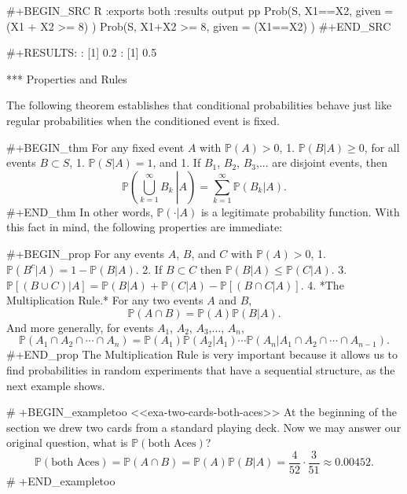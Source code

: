 #+BEGIN_SRC R :exports both :results output pp  
Prob(S, X1==X2, given = (X1 + X2 >= 8) )
Prob(S, X1+X2 >= 8, given = (X1==X2) )
#+END_SRC

#+RESULTS:
: [1] 0.2
: [1] 0.5

*** Properties and Rules

The following theorem establishes that conditional probabilities
behave just like regular probabilities when the conditioned event is
fixed.

#+BEGIN_thm
For any fixed event \(A\) with \(\mathbb{P}(A)>0\),
1. \( \mathbb{P} (B|A)\geq 0 \), for all events \( B \subset S\),
1. \( \mathbb{P} (S|A) = 1 \), and
1. If \(B_{1}\), \(B_{2}\), \(B_{3}\),... are disjoint events, then
  \begin{equation}
  \mathbb{P}\left(\left.\bigcup_{k=1}^{\infty}B_{k}\:\right|A\right)=\sum_{k=1}^{\infty}\mathbb{P}(B_{k}|A).
  \end{equation}
#+END_thm
In other words, \(\mathbb{P}(\cdot|A)\) is a legitimate probability
function. With this fact in mind, the following properties are
immediate:

#+BEGIN_prop
For any events \(A\), \(B\), and \(C\) with \(\mathbb{P}(A)>0\),
1. \( \mathbb{P} ( B^{c} | A ) = 1 - \mathbb{P} (B|A).\)
2. If \(B\subset C\) then \(\mathbb{P}(B|A)\leq\mathbb{P}(C|A)\).
3. \( \mathbb{P} [ ( B\cup C ) | A ] = \mathbb{P} (B|A) +
   \mathbb{P}(C|A) - \mathbb{P} [ (B \cap C|A) ].\)
4. *The Multiplication Rule.* For any two events \(A\) and \(B\),
   \begin{equation}
   \label{eq-multiplication-rule-short}
   \mathbb{P}(A\cap B)=\mathbb{P}(A)\mathbb{P}(B|A).
   \end{equation}
   And more generally, for events \(A_{1}\), \(A_{2}\), \(A_{3}\),...,
   \(A_{n}\),
   \begin{equation}
   \label{eq-multiplication-rule-long}
   \mathbb{P}(A_{1}\cap A_{2}\cap\cdots\cap A_{n})=\mathbb{P}(A_{1})\mathbb{P}(A_{2}|A_{1})\cdots\mathbb{P}(A_{n}|A_{1}\cap A_{2}\cap\cdots\cap A_{n-1}).
   \end{equation}
#+END_prop
The Multiplication Rule is very important because it allows us to find
probabilities in random experiments that have a sequential structure,
as the next example shows.

# +BEGIN_exampletoo
<<exa-two-cards-both-aces>> At the beginning of the section we drew
two cards from a standard playing deck. Now we may answer our original
question, what is \(\mathbb{P}(\mbox{both Aces})\)?  \[
\mathbb{P}(\mbox{both Aces})=\mathbb{P}(A\cap
B)=\mathbb{P}(A)\mathbb{P}(B|A)=\frac{4}{52}\cdot\frac{3}{51}\approx0.00452.
\]
# +END_exampletoo

